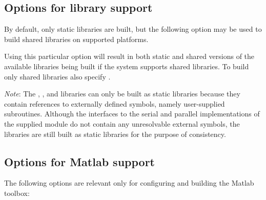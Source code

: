 \subsection*{Options for library support}

\noindent By default, only static libraries are built, but the following option
may be used to build shared libraries on supported platforms.

\begin{config}

\item {}

  Using this particular option will result in both static and shared versions of
  the available {\sundials} libraries being built if the system supports shared
  libraries. To build only shared libraries also specify .

  {\em Note}: The {\fcvode}, {\fkinsol}, and {\fida} libraries can only be built as
  static libraries because they contain references to externally defined symbols,
  namely user-supplied {\F} subroutines.  Although the {\F} interfaces to the serial
  and parallel implementations of the supplied {\nvector} module do not contain any
  unresolvable external symbols, the libraries are still built as static libraries
  for the purpose of consistency.

\end{config}


\subsection*{Options for Matlab support}

\noindent The following options are relevant only for configuring and building 
the {\sundialsTB} Matlab toolbox:

